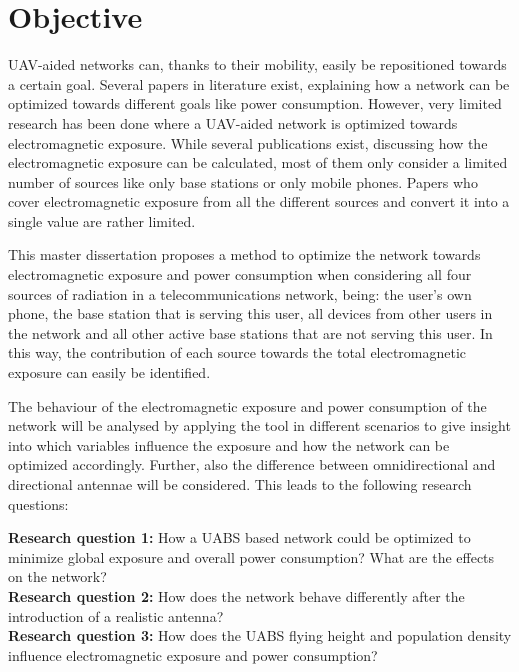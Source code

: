 \section{Objective}
\label{sec:objective}

\gls{UAV}-aided networks can, thanks to their mobility, easily be repositioned towards a certain goal. Several papers 
in literature exist, explaining how a network can be optimized towards different goals like power consumption.
However, very limited
research has been done where a \gls{UAV}-aided network is optimized towards electromagnetic exposure.
While several publications exist, discussing how the electromagnetic exposure can be calculated, most of them only consider a limited number of sources like only base stations or only mobile phones.
Papers who cover electromagnetic exposure from all the different sources and convert it into a single value are rather limited.

This master dissertation proposes a method to optimize the network towards electromagnetic exposure and power consumption
when considering all four sources of radiation in a telecommunications network, being: the user's own phone, 
the base station that is serving this user, 
all devices from other users in the network and all 
other active base stations that are not serving this user. In this way, the contribution of each source towards the total 
electromagnetic exposure can easily be identified. 

The behaviour of the electromagnetic exposure and power consumption of the network will be analysed by applying the tool in different scenarios 
to give insight into which variables influence the exposure and how
the network can be optimized accordingly. Further, also the difference between omnidirectional and directional antennae will 
be considered. This leads to the following research questions:

\textbf{Research question 1:} How a \gls{UABS} based network could be optimized to minimize global exposure and overall power consumption? 
What are the effects on the network?\\

\textbf{Research question 2:} How does the network behave differently after the introduction of a realistic antenna?\\

\textbf{Research question 3:} How does the \gls{UABS} flying height and population density influence electromagnetic 
exposure and power consumption?\\

